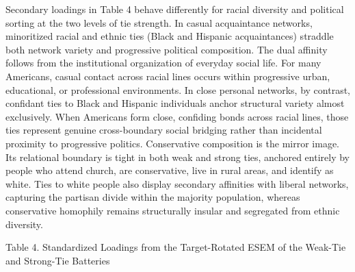 \documentclass[
  12pt
]{article}
\begin{document}
Secondary loadings in Table 4 behave differently for racial diversity and political sorting at the two levels of tie strength. In casual acquaintance networks, minoritized racial and ethnic ties (Black and Hispanic acquaintances) straddle both network variety and progressive political composition. The dual affinity follows from the institutional organization of everyday social life. For many Americans, casual contact across racial lines occurs within progressive urban, educational, or professional environments. In close personal networks, by contrast, confidant ties to Black and Hispanic individuals anchor structural variety almost exclusively. When Americans form close, confiding bonds across racial lines, those ties represent genuine cross-boundary social bridging rather than incidental proximity to progressive politics. Conservative composition is the mirror image. Its relational boundary is tight in both weak and strong ties, anchored entirely by people who attend church, are conservative, live in rural areas, and identify as white. Ties to white people also display secondary affinities with liberal networks, capturing the partisan divide within the majority population, whereas conservative homophily remains structurally insular and segregated from ethnic diversity.


Table 4. Standardized Loadings from the Target-Rotated ESEM of the Weak-Tie and Strong-Tie Batteries
\end{document}
